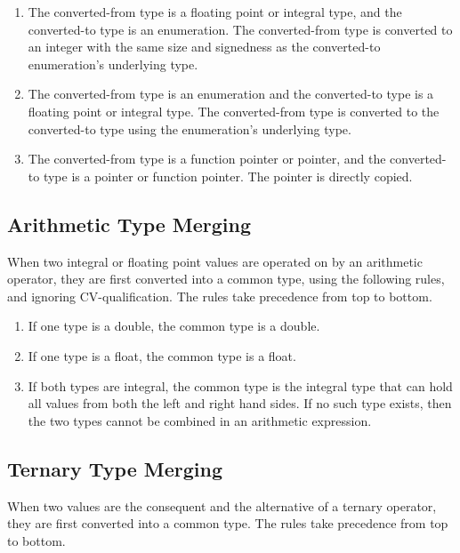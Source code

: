 \documentclass[letterpaper,12pt]{book}
\begin{document}
\begin{enumerate}
	\item The converted-from type is a floating point or integral type, and the converted-to type is an enumeration. The converted-from type is converted to an integer with the same size and signedness as the converted-to enumeration's underlying type.
	
	\item The converted-from type is an enumeration and the converted-to type is a floating point or integral type. The converted-from type is converted to the converted-to type using the enumeration's underlying type.
	
	\item The converted-from type is a function pointer or pointer, and the converted-to type is a pointer or function pointer. The pointer is directly copied.
\end{enumerate}

\subsection{Arithmetic Type Merging}\label{subsection:Arithmetic Type Merging}

When two integral or floating point values are operated on by an arithmetic operator, they are first converted into a common type, using the following rules, and ignoring CV-qualification. The rules take precedence from top to bottom.

\begin{enumerate}
	\item If one type is a double, the common type is a double.
	
	\item If one type is a float, the common type is a float.
	
	\item If both types are integral, the common type is the integral type that can hold all values from both the left and right hand sides. If no such type exists, then the two types cannot be combined in an arithmetic expression.
\end{enumerate}

\subsection{Ternary Type Merging}\label{subsection:Ternary Type Merging}

When two values are the consequent and the alternative of a ternary operator, they are first converted into a common type. The rules take precedence from top to bottom.
\end{document}
